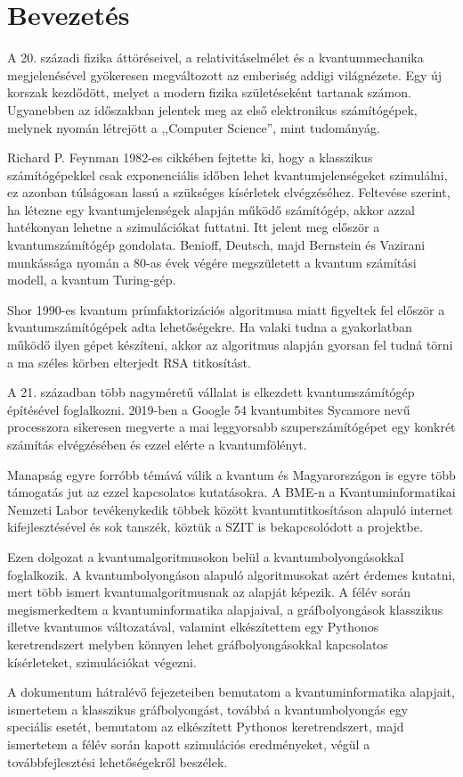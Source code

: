 \chapter{Bevezetés}

A 20. századi fizika áttöréseivel, a relativitáselmélet és a kvantummechanika
megjelenésével gyökeresen megváltozott az emberiség addigi világnézete. Egy új
korszak kezdődött, melyet a modern fizika születéseként tartanak számon.
Ugyanebben az időszakban jelentek meg az első elektronikus számítógépek,
melynek nyomán létrejött a ,,Computer Science'', mint tudományág.

Richard P. Feynman 1982-es cikkében fejtette ki, hogy a klasszikus
számítógépekkel csak exponenciális időben lehet kvantumjelenségeket szimulálni,
ez azonban túlságosan lassú a szükséges kísérletek elvégzéséhez. Feltevése
szerint, ha létezne egy kvantumjelenségek alapján működő számítógép, akkor
azzal hatékonyan lehetne a szimulációkat futtatni. Itt jelent meg először a
kvantumszámítógép gondolata. Benioff, Deutsch, majd Bernstein és Vazirani
munkássága nyomán a 80-as évek végére megszületett a kvantum számítási modell,
a kvantum Turing-gép.

Shor 1990-es kvantum prímfaktorizációs algoritmusa miatt figyeltek fel először
a kvantumszámítógépek adta lehetőségekre. Ha valaki tudna a gyakorlatban működő
ilyen gépet készíteni, akkor az algoritmus alapján gyorsan fel tudná törni a ma
széles körben elterjedt RSA titkosítást.

A 21. században több nagyméretű vállalat is elkezdett kvantumszámítógép
építésével foglalkozni. 2019-ben a Google 54 kvantumbites Sycamore nevű
processzora sikeresen megverte a mai leggyorsabb szuperszámítógépet egy konkrét
számítás elvégzésében és ezzel elérte a kvantumfölényt.

Manapság egyre forróbb témává válik a kvantum és Magyarországon is egyre több
támogatás jut az ezzel kapcsolatos kutatásokra. A BME-n a Kvantuminformatikai
Nemzeti Labor tevékenykedik többek között kvantumtitkosításon alapuló internet
kifejlesztésével és sok tanszék, köztük a SZIT is bekapcsolódott a projektbe.

Ezen dolgozat a kvantumalgoritmusokon belül a kvantumbolyongásokkal
foglalkozik. A kvantumbolyongáson alapuló algoritmusokat azért érdemes kutatni,
mert több ismert kvantumalgoritmusnak az alapját képezik. A félév során
megismerkedtem a kvantuminformatika alapjaival, a gráfbolyongások klasszikus
illetve kvantumos változatával, valamint elkészítettem egy Pythonos
keretrendszert melyben könnyen lehet gráfbolyongásokkal kapcsolatos
kísérleteket, szimulációkat végezni.

A dokumentum hátralévő fejezeteiben bemutatom a kvantuminformatika alapjait,
ismertetem a klasszikus gráfbolyongást, továbbá a kvantumbolyongás egy
speciális esetét, bemutatom az elkészített Pythonos keretrendszert, majd
ismertetem a félév során kapott szimulációs eredményeket, végül a
továbbfejlesztési lehetőségekről beszélek.